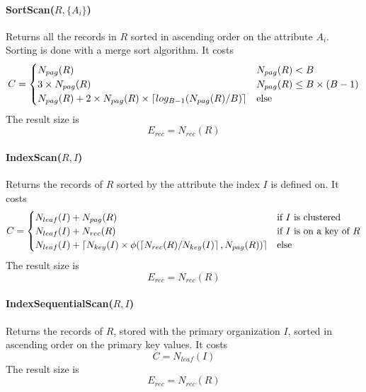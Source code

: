 \paragraph{SortScan($R, \{A_i\}$)}
Returns all the records in $R$ sorted in ascending order on the attribute $A_i$. Sorting is done with a merge sort algorithm. It costs
\begin{equation*}
    C = \begin{cases}
        N_{pag}(R) & N_{pag}(R) < B \\
        3 \times N_{pag}(R) & N_{pag}(R) \leq B \times (B-1) \\
        N_{pag}(R) + 2 \times N_{pag}(R) \times \left\lceil log_{B-1}(N_{pag}(R) / B)\right\rceil & \text{else}
    \end{cases}
\end{equation*}
The result size is
\begin{equation*}
    E_{rec} = N_{rec}(R)
\end{equation*}

\paragraph{IndexScan($R, I$)}
Returns the records of $R$ sorted by the attribute the index $I$ is defined on. It costs
\begin{equation*}
    C = \begin{cases}
        N_{leaf}(I) + N_{pag}(R) & \text{if $I$ is clustered} \\
        N_{leaf}(I) + N_{rec}(R) & \text{if $I$ is on a key of $R$} \\
        N_{leaf}(I) + \left\lceil N_{key}(I) \times \phi(\left\lceil N_{rec}(R) / N_{key}(I)\right\rceil, N_{pag}(R))\right\rceil & \text{else}
    \end{cases}
\end{equation*}
The result size is
\begin{equation*}
    E_{rec} = N_{rec}(R)
\end{equation*}

\paragraph{IndexSequentialScan($R, I$)}
Returns the records of $R$, stored with the primary organization $I$, sorted in ascending order on the primary key values. It costs
\begin{equation}
    C = N_{leaf}(I)
\end{equation}
The result size is
\begin{equation*}
    E_{rec} = N_{rec}(R)
\end{equation*}

